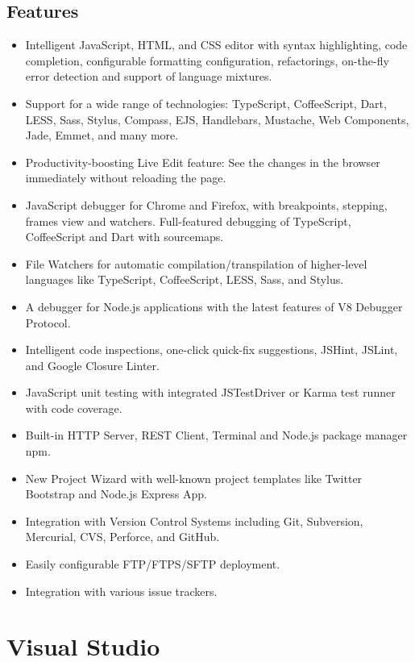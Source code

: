 \subsection{Features}
\begin{itemize}
\item Intelligent JavaScript, HTML, and CSS editor with syntax highlighting, code completion, configurable formatting configuration, refactorings, on-the-fly error detection and support of language mixtures.
\item Support for a wide range of technologies: TypeScript, CoffeeScript, Dart, LESS, Sass, Stylus, Compass, EJS, Handlebars, Mustache, Web Components, Jade, Emmet, and many more.
\item Productivity-boosting Live Edit feature: See the changes in the browser immediately without reloading the page.
\item 
JavaScript debugger for Chrome and Firefox, with breakpoints, stepping, frames view and watchers. Full-featured debugging of TypeScript, CoffeeScript and Dart with sourcemaps.
\item 
File Watchers for automatic compilation/transpilation of higher-level languages like TypeScript, CoffeeScript, LESS, Sass, and Stylus.
\item 
A debugger for Node.js applications with the latest features of V8 Debugger Protocol.
\item 
Intelligent code inspections, one-click quick-fix suggestions, JSHint, JSLint, and Google Closure Linter.
\item
JavaScript unit testing with integrated JSTestDriver or Karma test runner with code coverage. 
\item
Built-in HTTP Server, REST Client, Terminal and Node.js package manager npm. 
\item 
New Project Wizard with well-known project templates like Twitter Bootstrap and Node.js Express App.
\item
Integration with Version Control Systems including Git, Subversion, Mercurial, CVS, Perforce, and GitHub. 
\item 
Easily configurable FTP/FTPS/SFTP deployment.
\item 
Integration with various issue trackers.
\end{itemize}
















\section{Visual Studio}

